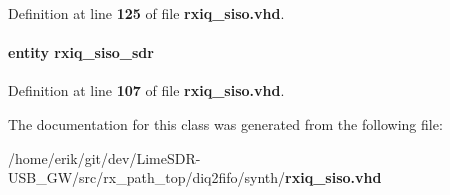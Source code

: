 Definition at line {\bf 125} of file {\bf rxiq\+\_\+siso.\+vhd}.

\paragraph[{rxiq\+\_\+siso\+\_\+sdr\+\_\+inst0}]{ {\bfseries \textcolor{keywordflow}{entity}\textcolor{vhdlchar}{ }\textcolor{vhdlchar}{rxiq\+\_\+siso\+\_\+sdr}\textcolor{vhdlchar}{ }} \hspace{0.3cm}{\ttfamily [Instantiation]}}\label{classrxiq__siso_1_1arch_aa31dbdfb8eecd91fad2f6c22c33fa887}


Definition at line {\bf 107} of file {\bf rxiq\+\_\+siso.\+vhd}.



The documentation for this class was generated from the following file\+:\begin{DoxyCompactItemize}
\item 
/home/erik/git/dev/\+Lime\+S\+D\+R-\/\+U\+S\+B\+\_\+\+G\+W/src/rx\+\_\+path\+\_\+top/diq2fifo/synth/{\bf rxiq\+\_\+siso.\+vhd}\end{DoxyCompactItemize}
